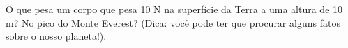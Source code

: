 O que pesa um corpo que pesa 10 N na superfície da Terra a uma altura de 10 m? No pico do Monte Everest? (Dica: você pode ter que procurar alguns fatos sobre o nosso planeta!).


